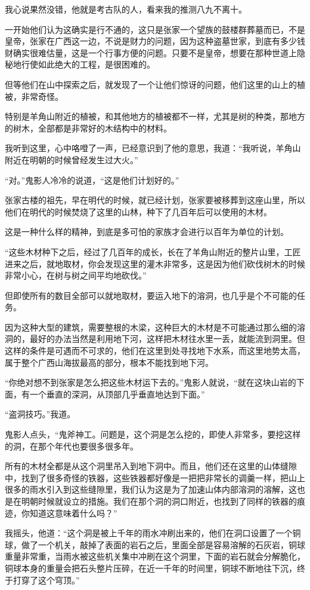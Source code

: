 我心说果然没错，他就是考古队的人，看来我的推测八九不离十。

一开始他们认为这确实是行不通的，这只是张家一个望族的鼓楼群葬墓而已，不是皇帝，张家在广西这一边，不说是财力的问题，因为这种盗墓世家，到底有多少钱财确实很难估量，这是一个行事方便的问题。只要不是皇帝，想要在那种世道上隐秘地行使如此绝大的工程，是很困难的。

但等他们在山中探索之后，就发现了一个让他们惊讶的问题，他们这里的山上的植被，非常奇怪。

特别是羊角山附近的植被，和其他地方的植被都不一样，尤其是树的种类，那地方的树木，全部都是非常好的木结构中的材料。

我听到这里，心中咯噔了一声，已经意识到了他的意思，我道：“我听说，羊角山附近在明朝的时候曾经发生过大火。”

“对。”鬼影人冷冷的说道，“这是他们计划好的。”

张家古楼的祖先，早在明代的时候，就已经计划，张家要被移葬到这座山里，所以他们在明代的时候焚烧了这里的山林，种下了几百年后可以使用的木材。

这是一种什么样的精神，到底是多可怕的家族才会进行以百年为单位的计划。

“这些木材种下之后，经过了几百年的成长，长在了羊角山附近的整片山里，工匠进来之后，就地取材，你会发现这里的灌木非常多，这是因为他们砍伐树木的时候非常小心，在树与树之间平均地砍伐。”

但即使所有的数目全部可以就地取材，要运入地下的溶洞，也几乎是个不可能的任务。

因为这种大型的建筑，需要整根的木梁，这种巨大的木材是不可能通过那么细的溶洞的，最好的办法当然是利用地下河，这样把木材往水里一丢，就能流到洞里。但这样的条件是可遇而不可求的，他们在这里到处寻找地下水系，而这里地势太高，属于整个广西山海拔最高的部分，根本不能找到地下河。

“你绝对想不到张家是怎么把这些木材运下去的。”鬼影人就说，“就在这块山岩的下面，有一个垂直的深洞，从顶部几乎垂直地达到下面。”

“盗洞技巧。”我道。

鬼影人点头，“鬼斧神工。问题是，这个洞是怎么挖的，即使人非常多，要挖这样的洞，在那个年代也要很多很多年。

所有的木材全都是从这个洞里吊入到地下洞中。而且，他们还在这里的山体缝隙中，找到了很多奇怪的铁器，这些铁器都好像是一把把非常长的调羹一样，把山上很多的雨水引入到这些缝隙里，我们认为这是为了加速山体内部溶洞的溶解，这也是在明朝时候就设立的措施。我们在那个洞的洞口附近，也找到了同样的铁器的痕迹，你知道这意味着什么吗？”

我摇头，他道：“这个洞是被上千年的雨水冲刷出来的，他们在洞口设置了一个铜球，做了一个机关，敲掉了表面的岩石之后，里面全部是容易溶解的石灰岩，铜球重量非常重，当雨水被这些机关集中冲刷在这个洞里，下面的岩石就会分解脆化，铜球本身的重量会把石头整片压碎，在近一千年的时间里，铜球不断地往下沉，终于打穿了这个穹顶。”

